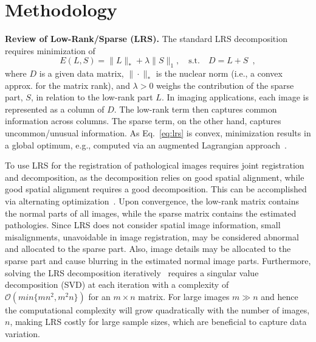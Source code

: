 \documentclass{article}
\begin{document}
\section{Methodology}
\label{section:methodology}
\noindent
\textbf{Review of Low-Rank/Sparse (LRS).}
The standard LRS decomposition requires minimization of
\begin{equation}
E(L,S) = \|L\|_* + \lambda\|S\|_1,\quad\text{s.t.}\quad D = L + S\enspace, 
\label{eq:lrs}
\end{equation}
where $D$ is a given data matrix, $\|\cdot\|_*$ is the nuclear norm (i.e., a convex approx. for the matrix rank), and $\lambda>0$ weighs the contribution of the sparse part, $S$, in relation to the low-rank part $L$. In imaging applications, each image is represented as a column of $D$. The low-rank term then captures common information across columns. The sparse term, on the other hand, captures uncommon/unusual information. As Eq.~\eqref{eq:lrs} is convex, minimization results in a global optimum, e.g., computed via an augmented Lagrangian approach~\cite{Lin2010}. 

To use LRS for the registration of pathological images requires joint registration and decomposition, as the decomposition relies on good spatial alignment, while good spatial alignment requires a good decomposition. This can be accomplished via alternating optimization~\cite{Liu2015}. Upon convergence, the low-rank matrix contains the normal parts of all images, while the sparse matrix contains the estimated pathologies. Since LRS does not consider spatial image information, small misalignments, unavoidable in image registration, may be considered abnormal and allocated to the sparse part. Also, image details may be allocated to the sparse part and cause blurring in the estimated normal image parts. Furthermore, solving the LRS decomposition iteratively~\cite{Lin2010} requires a singular value decomposition (SVD) at each iteration with a complexity of $\mathcal{O}(min\{mn^2,m^2n\})$\cite{holmes2007} for an $m\times n$ matrix. For large images $m\gg n$ and hence the computational complexity will grow quadratically with the number of images, $n$, making LRS costly for large sample sizes, which are beneficial to capture data variation.
\end{document}
